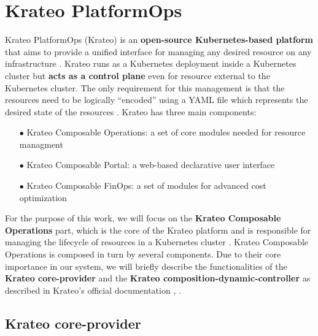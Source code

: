 \section{Krateo PlatformOps}
\label{sec:krateo}

Krateo PlatformOps (Krateo) is an \textbf{open-source Kubernetes-based platform} that aims to provide a unified interface for managing any desired resource on any infrastructure \cite{krateo_docs}.
Krateo runs as a Kubernetes deployment inside a Kubernetes cluster but \textbf{acts as a control plane} even for resource external to the Kubernetes cluster.
The only requirement for this management is that the resources need to be logically ``encoded'' using a YAML file which represents the desired state of the resources \cite{krateo_docs}. \newline
Krateo has three main components:
\begin{itemize}[itemsep=0.2pt, topsep=1pt]
    \item[$\bullet$] Krateo Composable Operations: a set of core modules needed for resource managment
    \item[$\bullet$] Krateo Composable Portal: a web-based declarative user interface
    \item[$\bullet$] Krateo Composable FinOps: a set of modules for advanced cost optimization
\end{itemize}

For the purpose of this work, we will focus on the \textbf{Krateo Composable Operations} part, which is the core of the Krateo platform and is responsible for managing the lifecycle of resources in a Kubernetes cluster \cite{krateo_docs}.
Krateo Composable Operations is composed in turn by several components. 
Due to their core importance in our system, we will briefly describe the functionalities of the \textbf{Krateo core-provider} and the \textbf{Krateo composition-dynamic-controller} as described in Krateo's official documentation \cite{krateo_core_provider}, \cite{krateo_composition_dynamic_controller}.

\subsection{Krateo core-provider}

